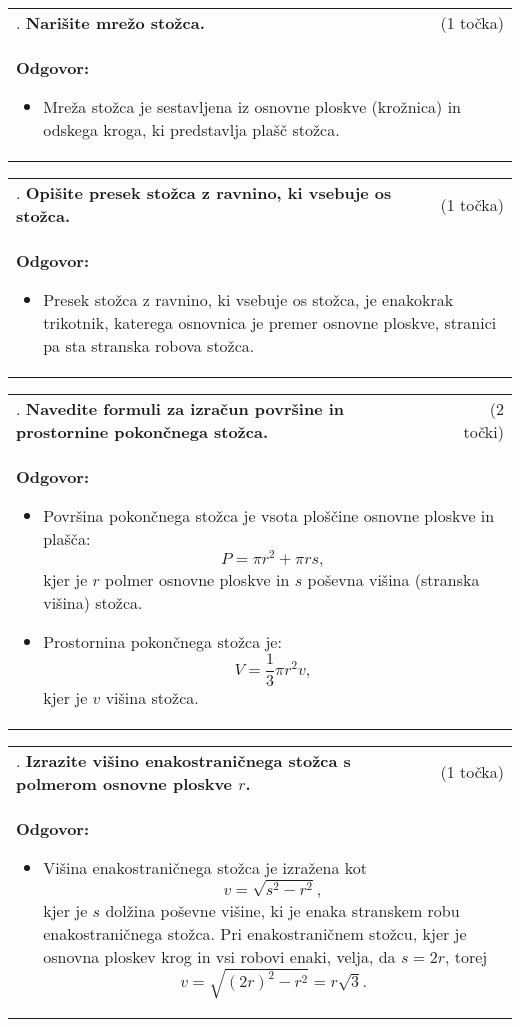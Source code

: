 \documentclass[12pt]{article}
\newcounter{vprasanje}[section]
\renewcommand{\thevprasanje}{\roman{vprasanje}}
\newcommand{\vprasanje}[2]{%
  \stepcounter{vprasanje}%
  \textbf{\thevprasanje}. \textbf{#1} & (#2) \\
}
\newcommand{\odgovor}[1]{%
  \multicolumn{2}{p{\dimexpr\textwidth-2\tabcolsep\relax}}{%
    \small \textbf{Odgovor:} #1%
  } \\[1em]%
}
\newcommand{\razmak}[1]{%
  \vspace{#1}
}
\begin{document}
\razmak{1em}

\begin{tabularx}{\textwidth}{X r}
\vprasanje{Narišite mrežo stožca.}{1 točka}
\odgovor{
\begin{itemize}
	\item Mreža stožca je sestavljena iz osnovne ploskve (krožnica) in odskega kroga, ki predstavlja plašč stožca.
\end{itemize}
}
\end{tabularx}

\begin{tabularx}{\textwidth}{X r}
\vprasanje{Opišite presek stožca z ravnino, ki vsebuje os stožca.}{1 točka}
\odgovor{
\begin{itemize}
	\item	Presek stožca z ravnino, ki vsebuje os stožca, je enakokrak trikotnik, katerega osnovnica je premer osnovne ploskve, stranici pa sta stranska robova stožca.
\end{itemize}
}
\end{tabularx}

\begin{tabularx}{\textwidth}{X r}
\vprasanje{Navedite formuli za izračun površine in prostornine pokončnega stožca.}{2 točki}
\odgovor{
\begin{itemize}
  \item Površina pokončnega stožca je vsota ploščine osnovne ploskve in plašča:
  \[
  P = \pi r^2 + \pi r s,
  \]
  kjer je $r$ polmer osnovne ploskve in $s$ poševna višina (stranska višina) stožca.
  \item Prostornina pokončnega stožca je:
  \[
  V = \frac{1}{3} \pi r^2 v,
  \]
  kjer je $v$ višina stožca.
\end{itemize}
}
\end{tabularx}

\begin{tabularx}{\textwidth}{X r}
\vprasanje{Izrazite višino enakostraničnega stožca s polmerom osnovne ploskve $r$.}{1 točka}
\odgovor{
\begin{itemize}
	\item Višina enakostraničnega stožca je izražena kot
	\[
	v = \sqrt{s^2 - r^2},
	\]
	kjer je $s$ dolžina poševne višine, ki je enaka stranskem robu enakostraničnega stožca. Pri enakostraničnem stožcu, kjer je osnovna ploskev krog in vsi robovi enaki, velja, da $s = 2r$, torej
	\[
	v = \sqrt{(2r)^2 - r^2} = r\sqrt{3}.
	\]
\end{itemize}
}
\end{tabularx}
\razmak{0.5em}
\end{document}
